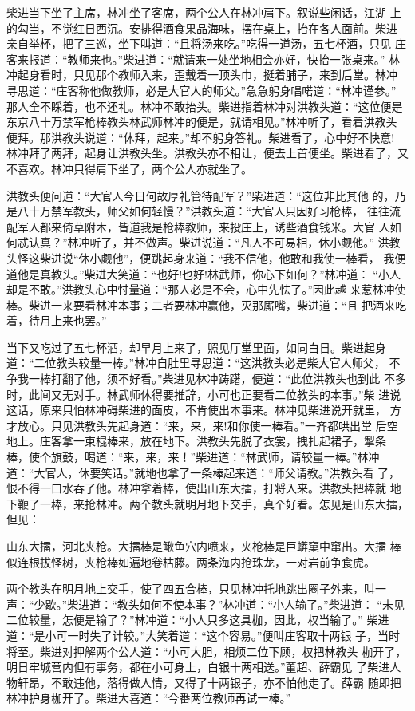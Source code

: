 柴进当下坐了主席，林冲坐了客席，两个公人在林冲肩下。叙说些闲话，江湖
上的勾当，不觉红日西沉。安排得酒食果品海味，摆在桌上，抬在各人面前。柴进
亲自举杯，把了三巡，坐下叫道：“且将汤来吃。”吃得一道汤，五七杯酒，只见
庄客来报道：“教师来也。”柴进道：“就请来一处坐地相会亦好，快抬一张桌来。”
林冲起身看时，只见那个教师入来，歪戴着一顶头巾，挺着脯子，来到后堂。林冲
寻思道：“庄客称他做教师，必是大官人的师父。”急急躬身唱喏道：“林冲谨参。”
那人全不睬着，也不还礼。林冲不敢抬头。柴进指着林冲对洪教头道：“这位便是
东京八十万禁军枪棒教头林武师林冲的便是，就请相见。”林冲听了，看着洪教头
便拜。那洪教头说道：“休拜，起来。”却不躬身答礼。柴进看了，心中好不快意!
林冲拜了两拜，起身让洪教头坐。洪教头亦不相让，便去上首便坐。柴进看了，又
不喜欢。林冲只得肩下坐了，两个公人亦就坐了。

洪教头便问道：“大官人今日何故厚礼管待配军？”柴进道：“这位非比其他
的，乃是八十万禁军教头，师父如何轻慢？”洪教头道：“大官人只因好习枪棒，
往往流配军人都来倚草附木，皆道我是枪棒教师，来投庄上，诱些酒食钱米。大官
人如何忒认真？”林冲听了，并不做声。柴进说道：“凡人不可易相，休小觑他。”
洪教头怪这柴进说“休小觑他”，便跳起身来道：“我不信他，他敢和我使一棒看，
我便道他是真教头。”柴进大笑道：“也好!也好!林武师，你心下如何？”林冲道：
“小人却是不敢。”洪教头心中忖量道：“那人必是不会，心中先怯了。”因此越
来惹林冲使棒。柴进一来要看林冲本事；二者要林冲赢他，灭那厮嘴，柴进道：“且
把酒来吃着，待月上来也罢。”

当下又吃过了五七杯酒，却早月上来了，照见厅堂里面，如同白日。柴进起身
道：“二位教头较量一棒。”林冲自肚里寻思道：“这洪教头必是柴大官人师父，
不争我一棒打翻了他，须不好看。”柴进见林冲踌躇，便道：“此位洪教头也到此
不多时，此间又无对手。林武师休得要推辞，小可也正要看二位教头的本事。”柴
进说这话，原来只怕林冲碍柴进的面皮，不肯使出本事来。林冲见柴进说开就里，
方才放心。只见洪教头先起身道：“来，来，来!和你使一棒看。”一齐都哄出堂
后空地上。庄客拿一束棍棒来，放在地下。洪教头先脱了衣裳，拽扎起裙子，掣条
棒，使个旗鼓，喝道：“来，来，来！”柴进道：“林武师，请较量一棒。”林冲
道：“大官人，休要笑话。”就地也拿了一条棒起来道：“师父请教。”洪教头看
了，恨不得一口水吞了他。林冲拿着棒，使出山东大擂，打将入来。洪教头把棒就
地下鞭了一棒，来抢林冲。两个教头就明月地下交手，真个好看。怎见是山东大擂，
但见：

山东大擂，河北夹枪。大擂棒是鳅鱼穴内喷来，夹枪棒是巨蟒窠中窜出。大擂
棒似连根拔怪树，夹枪棒如遍地卷枯藤。两条海内抢珠龙，一对岩前争食虎。

两个教头在明月地上交手，使了四五合棒，只见林冲托地跳出圈子外来，叫一
声：“少歇。”柴进道：“教头如何不使本事？”林冲道：“小人输了。”柴进道：
“未见二位较量，怎便是输了？”林冲道：“小人只多这具枷，因此，权当输了。”
柴进道：“是小可一时失了计较。”大笑着道：“这个容易。”便叫庄客取十两银
子，当时将至。柴进对押解两个公人道：“小可大胆，相烦二位下顾，权把林教头
枷开了，明日牢城营内但有事务，都在小可身上，白银十两相送。”董超、薛霸见
了柴进人物轩昂，不敢违他，落得做人情，又得了十两银子，亦不怕他走了。薛霸
随即把林冲护身枷开了。柴进大喜道：“今番两位教师再试一棒。”

